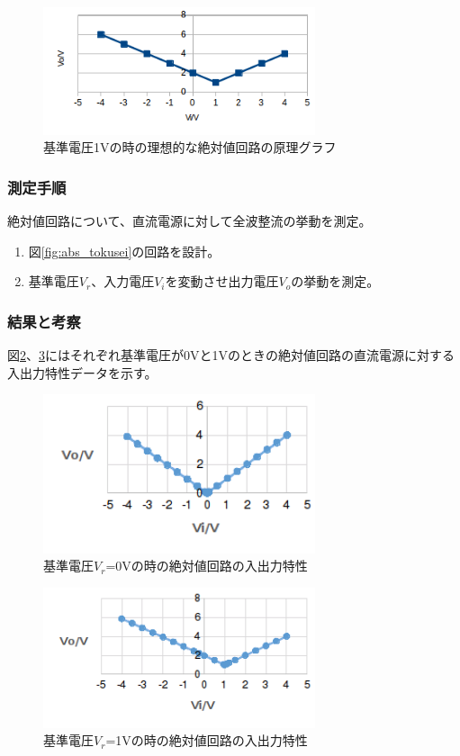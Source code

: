 \documentclass[11pt,a4j]{jsarticle}
\begin{document}
    \begin{figure}[htbp]
  \centering
  \includegraphics[width=8cm,clip]{risou_absr1.png}
  \caption{基準電圧1Vの時の理想的な絶対値回路の原理グラフ}
  \label{fig:risou_absr1}
 \end{figure}
    
    
    
   \subsubsection{測定手順}
    絶対値回路について、直流電源に対して全波整流の挙動を測定。
    \begin{enumerate}
    \item 図\ref{fig:abs_tokusei}の回路を設計。
    \item 基準電圧$V_r$、入力電圧$V_i$を変動させ出力電圧$V_o$の挙動を測定。
    \end{enumerate}
    
   \subsubsection{結果と考察} \label{sec:abs_tokusei}
    
    図\ref{fig:2_Vr0}、\ref{fig:2_Vr1}にはそれぞれ基準電圧が0Vと1Vのときの絶対値回路の直流電源に対する入出力特性データを示す。
    
    \begin{figure}[htbp]
  \centering
  \includegraphics[width=8cm,clip]{2_Vr0.png}
  \caption{基準電圧$V_r$=0Vの時の絶対値回路の入出力特性}
  \label{fig:2_Vr0}
 \end{figure}%
    
    \begin{figure}[htbp]
  \centering
  \includegraphics[width=8cm,clip]{2_Vr1.png}
  \caption{基準電圧$V_r$=1Vの時の絶対値回路の入出力特性}
  \label{fig:2_Vr1}
 \end{figure}%
    
\end{document}

